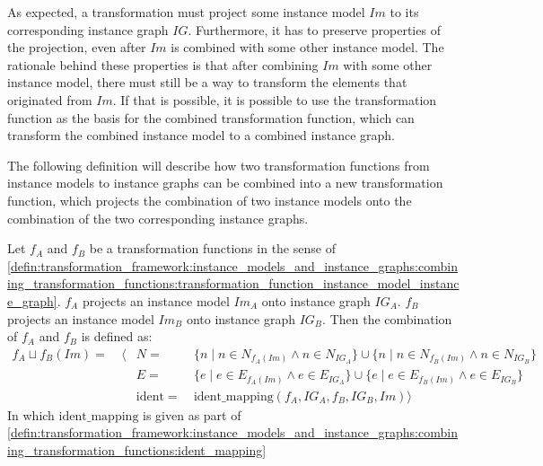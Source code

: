 As expected, a transformation must project some instance model $Im$ to its corresponding instance graph $IG$. Furthermore, it has to preserve properties of the projection, even after $Im$ is combined with some other instance model. The rationale behind these properties is that after combining $Im$ with some other instance model, there must still be a way to transform the elements that originated from $Im$. If that is possible, it is possible to use the transformation function as the basis for the combined transformation function, which can transform the combined instance model to a combined instance graph.

The following definition will describe how two transformation functions from instance models to instance graphs can be combined into a new transformation function, which projects the combination of two instance models onto the combination of the two corresponding instance graphs.

\begin{defin}
\label{defin:transformation_framework:instance_models_and_instance_graphs:combining_transformation_functions:combination_transformation_function_instance_model_instance_graph}
Let $f_A$ and $f_B$ be a transformation functions in the sense of \cref{defin:transformation_framework:instance_models_and_instance_graphs:combining_transformation_functions:transformation_function_instance_model_instance_graph}. $f_A$ projects an instance model $Im_A$ onto instance graph $IG_A$. $f_B$ projects an instance model $Im_B$ onto instance graph $IG_B$. Then the combination of $f_A$ and $f_B$ is defined as:
\begin{align*}
f_{A} \sqcup f_{B}(Im) =\ &\langle&
N =\ &\{n \mid n \in N_{f_{A}(Im)} \land n \in N_{IG_A} \} \cup \{n \mid n \in N_{f_{B}(Im)} \land n \in N_{IG_B} \} \\&&
E =\ &\{e \mid e \in E_{f_{A}(Im)} \land e \in E_{IG_A} \} \cup \{e \mid e \in E_{f_{B}(Im)} \land e \in E_{IG_B} \} \\&&
\mathrm{ident} =\ &\mathrm{ident\_\!mapping}(f_A, IG_A, f_B, IG_B, Im)
\rangle
\end{align*}
In which $\mathrm{ident\_\!mapping}$ is given as part of \cref{defin:transformation_framework:instance_models_and_instance_graphs:combining_transformation_functions:ident_mapping}
\end{defin}

